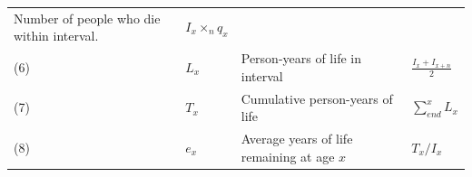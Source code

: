 \documentclass[]{book}
\begin{document}
\begin{longtable}[]{@{}llll@{}}
\begin{minipage}[t]{0.44\columnwidth}
Number of people who die within interval.\strut
\end{minipage} & \begin{minipage}[t]{0.10\columnwidth}\raggedright
\(I_x \times _nq_x\)\strut
\end{minipage}\tabularnewline
\begin{minipage}[t]{0.12\columnwidth}\raggedright
(6)\strut
\end{minipage} & \begin{minipage}[t]{0.22\columnwidth}\raggedright
\(L_x\)\strut
\end{minipage} & \begin{minipage}[t]{0.44\columnwidth}\raggedright
Person-years of life in interval\strut
\end{minipage} & \begin{minipage}[t]{0.10\columnwidth}\raggedright
\(\frac{I_{x}+I_{x+n}}{2}\)\strut
\end{minipage}\tabularnewline
\begin{minipage}[t]{0.12\columnwidth}\raggedright
(7)\strut
\end{minipage} & \begin{minipage}[t]{0.22\columnwidth}\raggedright
\(T_x\)\strut
\end{minipage} & \begin{minipage}[t]{0.44\columnwidth}\raggedright
Cumulative person-years of life\strut
\end{minipage} & \begin{minipage}[t]{0.10\columnwidth}\raggedright
\(\sum_{end}^x{L_x}\)\strut
\end{minipage}\tabularnewline
\begin{minipage}[t]{0.12\columnwidth}\raggedright
(8)\strut
\end{minipage} & \begin{minipage}[t]{0.22\columnwidth}\raggedright
\(e_x\)\strut
\end{minipage} & \begin{minipage}[t]{0.44\columnwidth}\raggedright
Average years of life remaining at age \(x\)\strut
\end{minipage} & \begin{minipage}[t]{0.10\columnwidth}\raggedright
\(T_x/I_x\)\strut
\end{minipage}\tabularnewline
\bottomrule
\end{longtable}
\end{document}
